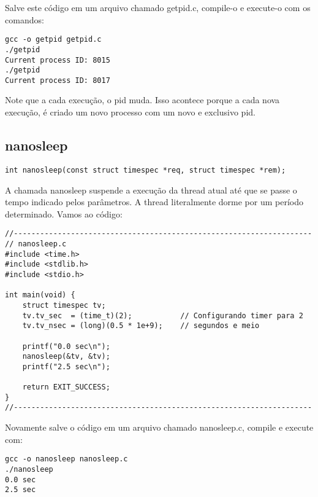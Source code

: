 Salve este código em um arquivo chamado getpid.c, compile-o e execute-o com os comandos:

\begin{espacosimples}
\begin{verbatim}
gcc -o getpid getpid.c
./getpid
Current process ID: 8015
./getpid
Current process ID: 8017
\end{verbatim}
\end{espacosimples}

Note que a cada execução, o pid muda. Isso acontece porque a cada nova execução, é criado um novo processo com um novo e exclusivo pid.

\subsection{nanosleep}

\begin{verbatim}
int nanosleep(const struct timespec *req, struct timespec *rem);
\end{verbatim}

A chamada nanosleep suspende a execução da thread atual até que se passe o tempo indicado pelos parâmetros\cite{Man}. A thread literalmente dorme por um período determinado. Vamos ao código:

\newpage

\begin{espacosimples}
\begin{verbatim}
//--------------------------------------------------------------------
// nanosleep.c
#include <time.h>
#include <stdlib.h>
#include <stdio.h>

int main(void) {
    struct timespec tv;
    tv.tv_sec  = (time_t)(2);           // Configurando timer para 2
    tv.tv_nsec = (long)(0.5 * 1e+9);    // segundos e meio
    
    printf("0.0 sec\n");
    nanosleep(&tv, &tv);
    printf("2.5 sec\n");
    
    return EXIT_SUCCESS;
}
//--------------------------------------------------------------------
\end{verbatim}
\end{espacosimples}

Novamente salve o código em um arquivo chamado nanosleep.c, compile e execute com:

\begin{espacosimples}
\begin{verbatim}
gcc -o nanosleep nanosleep.c
./nanosleep
0.0 sec
2.5 sec
\end{verbatim}
\end{espacosimples}

